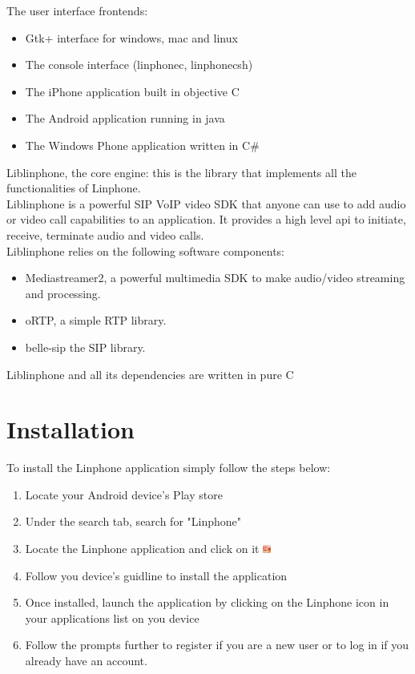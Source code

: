 \documentclass[11pt]{article}
\begin{document}
The user interface frontends:
\begin{itemize}
\item Gtk+ interface for windows, mac and linux
\item The console interface (linphonec, linphonecsh)
\item The iPhone application built in objective C
\item The Android application running in java
\item The Windows Phone application written in C\#
\end{itemize}
Liblinphone, the core engine: this is the library that implements all the functionalities of Linphone. \\
Liblinphone is a powerful SIP VoIP video SDK that anyone can use to add audio or video call capabilities to an application. It provides a high level api to initiate, receive, terminate audio and video calls.\\
Liblinphone relies on the following software components:
\begin{itemize}
\item Mediastreamer2, a powerful multimedia SDK to make audio/video streaming and processing.
\item oRTP, a simple RTP library.
\item belle-sip the SIP library.
\end{itemize}
Liblinphone and all its dependencies are written in pure C

\section{Installation}
To install the Linphone application simply follow the steps below:
\begin{enumerate}
\item Locate your Android device's Play store
\item Under the search tab, search for "Linphone"
\item Locate the Linphone application and click on it \includegraphics[width=10px]{./images/icon.jpg}
\item Follow you device's guidline to install the application
\item Once installed, launch the application by clicking on the Linphone icon in your applications list on you device
\item Follow the prompts further to register if you are a new user or to log in if you already have an account.
\end{enumerate}
\end{document}
